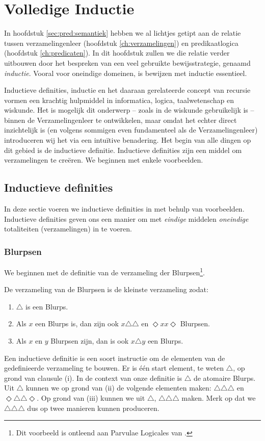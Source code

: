 \chapter{Volledige Inductie}\label{ch:inductie}

In hoofdstuk \ref{sec:pred:semantiek} hebben we al lichtjes getipt aan de relatie tussen verzamelingenleer (hoofdstuk \ref{ch:verzamelingen}) en predikaatlogica (hoofdstuk \ref{ch:predicaten}). In dit hoofdstuk zullen we die relatie verder uitbouwen door het bespreken van een veel gebruikte bewijsstrategie, genaamd \textit{inductie}. Vooral voor oneindige domeinen, is bewijzen met inductie essentieel.

Inductieve definities, inductie en het daaraan gerelateerde concept van recursie vormen een krachtig hulpmiddel in informatica, logica, taalwetenschap en wiskunde. Het is mogelijk dit onderwerp -- zoals in de wiskunde gebruikelijk is -- binnen de Verzamelingenleer te ontwikkelen, maar omdat het echter direct inzichtelijk is (en volgens sommigen even fundamenteel als de Verzamelingenleer) introduceren wij het via een intu\"itive benadering. Het begin van alle dingen op dit gebied is de inductieve definitie. Inductieve definities zijn een middel om verzamelingen te cre\"eren. We beginnen met enkele voorbeelden.

\section{Inductieve definities}
In deze sectie voeren we inductieve definities in met behulp van voorbeelden. Inductieve definities geven ons een manier om met \textit{eindige} middelen \textit{oneindige} totaliteiten (verzamelingen) in te voeren.

\subsection*{Blurpsen}
We beginnen met de definitie van de verzameling der Blurpsen\footnote{Dit voorbeeld is ontleend aan Parvulae Logicales van \citet{parvulae}.}.
\begin{definition}
De verzameling van de Blurpsen is de kleinste verzameling zodat:
\begin{enumerate}[label=\roman*.]
    \item $\triangle$ is een Blurps.
    \item Als $x$ een Blurps is, dan zijn ook $x\triangle\triangle$ en $\Diamond xx\Diamond$ Blurpsen.
    \item Als $x$ en $y$ Blurpsen zijn, dan is ook $x\triangle y$ een Blurps.
\end{enumerate}
\end{definition}
Een inductieve definitie is een soort instructie om de elementen van de gedefinieerde verzameling te bouwen. Er is \'e\'en start element, te weten $\triangle$, op grond van clausule (i). In de context van onze definitie is $\triangle$ de atomaire Blurps. Uit $\triangle$ kunnen we op grond van (ii) de volgende elementen maken: $\triangle\triangle\triangle$ en $\Diamond\triangle\triangle\Diamond$. Op grond van (iii) kunnen we uit $\triangle$, $\triangle\triangle\triangle$ maken. Merk op dat we $\triangle\triangle\triangle$ dus op twee manieren kunnen produceren.

